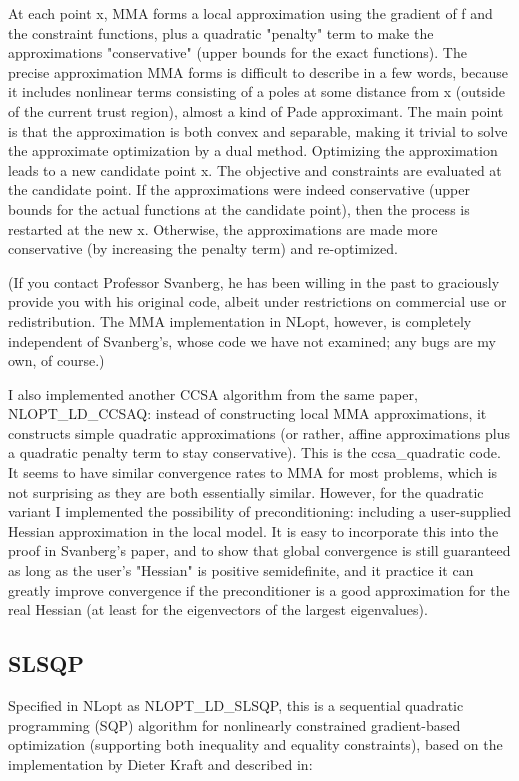 At each point x, MMA forms a local approximation using the gradient of f and the constraint functions, plus a quadratic "penalty" term to make the approximations "conservative" (upper bounds for the exact functions). The precise approximation MMA forms is difficult to describe in a few words, because it includes nonlinear terms consisting of a poles at some distance from x (outside of the current trust region), almost a kind of Pade approximant. The main point is that the approximation is both convex and separable, making it trivial to solve the approximate optimization by a dual method. Optimizing the approximation leads to a new candidate point x. The objective and constraints are evaluated at the candidate point. If the approximations were indeed conservative (upper bounds for the actual functions at the candidate point), then the process is restarted at the new x. Otherwise, the approximations are made more conservative (by increasing the penalty term) and re-optimized. 

(If you contact Professor Svanberg, he has been willing in the past to graciously provide you with his original code, albeit under restrictions on commercial use or redistribution. The MMA implementation in NLopt, however, is completely independent of Svanberg's, whose code we have not examined; any bugs are my own, of course.) 

I also implemented another CCSA algorithm from the same paper, NLOPT\_LD\_CCSAQ: instead of constructing local MMA approximations, it constructs simple quadratic approximations (or rather, affine approximations plus a quadratic penalty term to stay conservative). This is the ccsa\_quadratic code. It seems to have similar convergence rates to MMA for most problems, which is not surprising as they are both essentially similar. However, for the quadratic variant I implemented the possibility of preconditioning: including a user-supplied Hessian approximation in the local model. It is easy to incorporate this into the proof in Svanberg's paper, and to show that global convergence is still guaranteed as long as the user's "Hessian" is positive semidefinite, and it practice it can greatly improve convergence if the preconditioner is a good approximation for the real Hessian (at least for the eigenvectors of the largest eigenvalues). 



\subsection{SLSQP}
Specified in NLopt as NLOPT\_LD\_SLSQP, this is a sequential quadratic programming (SQP) algorithm for nonlinearly constrained gradient-based optimization (supporting both inequality and equality constraints), based on the implementation by Dieter Kraft and described in: 

